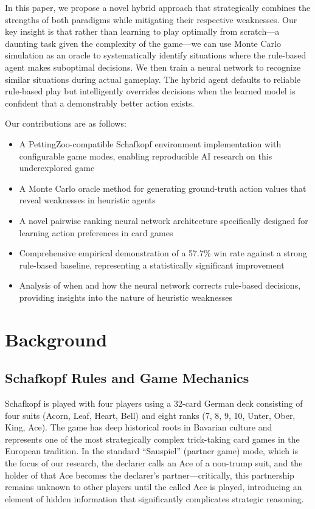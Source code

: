 \documentclass[conference]{IEEEtran}
\begin{document}
In this paper, we propose a novel hybrid approach that strategically combines the strengths of both paradigms while mitigating their respective weaknesses. Our key insight is that rather than learning to play optimally from scratch—a daunting task given the complexity of the game—we can use Monte Carlo simulation as an oracle to systematically identify situations where the rule-based agent makes suboptimal decisions. We then train a neural network to recognize similar situations during actual gameplay. The hybrid agent defaults to reliable rule-based play but intelligently overrides decisions when the learned model is confident that a demonstrably better action exists.

Our contributions are as follows:
\begin{itemize}
    \item A PettingZoo-compatible Schafkopf environment implementation with configurable game modes, enabling reproducible AI research on this underexplored game
    \item A Monte Carlo oracle method for generating ground-truth action values that reveal weaknesses in heuristic agents
    \item A novel pairwise ranking neural network architecture specifically designed for learning action preferences in card games
    \item Comprehensive empirical demonstration of a 57.7\% win rate against a strong rule-based baseline, representing a statistically significant improvement
    \item Analysis of when and how the neural network corrects rule-based decisions, providing insights into the nature of heuristic weaknesses
\end{itemize}

\section{Background}

\subsection{Schafkopf Rules and Game Mechanics}

Schafkopf is played with four players using a 32-card German deck consisting of four suits (Acorn, Leaf, Heart, Bell) and eight ranks (7, 8, 9, 10, Unter, Ober, King, Ace). The game has deep historical roots in Bavarian culture and represents one of the most strategically complex trick-taking card games in the European tradition. In the standard ``Sauspiel'' (partner game) mode, which is the focus of our research, the declarer calls an Ace of a non-trump suit, and the holder of that Ace becomes the declarer's partner—critically, this partnership remains unknown to other players until the called Ace is played, introducing an element of hidden information that significantly complicates strategic reasoning.
\end{document}

